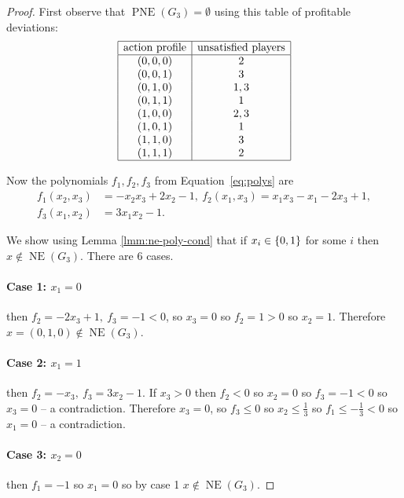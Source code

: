 \documentclass[preprint,12pt,authoryear]{elsarticle}
\DeclarePairedDelimiter{\ios}{\{}{\}}
\newcommand{\s}{\ios*}
\DeclareMathOperator{\NE}{NE}
\DeclareMathOperator{\PNE}{PNE}
\begin{document}
\begin{proof}
  First observe that $\PNE(G_3)=\emptyset$ using this table of profitable deviations:
  \begin{align*}
    \begin{array}{|c|c|}
      \hline
      \text{action profile}&\text{unsatisfied players}\\
      \hline
      (0,0,0)&2\\
      (0,0,1)&3\\
      (0,1,0)&1,3\\
      (0,1,1)&1\\
      (1,0,0)&2,3\\
      (1,0,1)&1\\
      (1,1,0)&3\\
      (1,1,1)&2\\
      \hline
    \end{array}
  \end{align*}
  
  Now the polynomials $f_1,f_2,f_3$ from Equation~\ref{eq:polys} are
  \begin{align*}
    f_1(x_2,x_3)&=-x_2x_3+2x_2-1,~f_2(x_1,x_3)=x_1x_3-x_1-2x_3+1,\\
    f_3(x_1,x_2)&=3x_1x_2-1.
  \end{align*}

  We show using Lemma \ref{lmm:ne-poly-cond} that if $x_i\in\s{0,1}$ for some $i$ then 
  $x\notin\NE(G_3)$. There are 6 cases.

  \paragraph{Case 1: $x_1=0$} then $f_2=-2x_3+1,~f_3=-1<0$, so $x_3=0$ so $f_2=1>0$ so 
  $x_2=1$. Therefore $x=(0,1,0)\notin\NE(G_3)$.
  
  \paragraph{Case 2: $x_1=1$} then $f_2=-x_3,~f_3=3x_2-1$.
  If $x_3>0$ then $f_2<0$ so $x_2=0$ so $f_3=-1<0$ so $x_3=0$ -- a contradiction. Therefore 
  $x_3=0$, so $f_3\le0$ so $x_2\le\frac{1}{3}$ so $f_1\le-\frac{1}{3}<0$ so $x_1=0$ -- a 
  contradiction.

  \paragraph{Case 3: $x_2=0$} then $f_1=-1$ so $x_1=0$ so by case 1 $x\notin\NE(G_3)$.


\end{proof}
\end{document}
